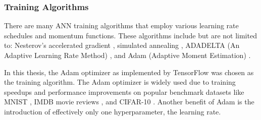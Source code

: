 
%
%

\subsubsection{Training Algorithms} \label{section_training_algs}

There are many ANN training algorithms that employ various learning rate schedules and momentum functions. These algorithms include but are not limited to: Nesterov's accelerated gradient \cite{nesterov1983}, simulated annealing \cite{Kirkpatrick1983}, ADADELTA (An Adaptive Learning Rate Method) \cite{ADADELTA}, and Adam (Adaptive Moment Estimation) \cite{Kingma2015}. 

In this thesis, the Adam optimizer as implemented by TensorFlow \cite{tensorflow2015-whitepaper} was chosen as the training algorithm. The Adam optimizer is widely used due to training speedups and performance improvements on popular benchmark datasets like MNIST \cite{lecun98}, IMDB movie reviews \cite{Maas2011}, and CIFAR-10 \cite{Krizhevsky2009}. Another benefit of Adam is the introduction of effectively only one hyperparameter, the learning rate.

